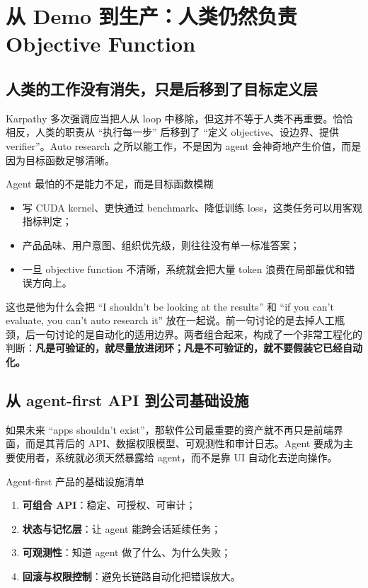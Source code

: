 \section{从 Demo 到生产：人类仍然负责 Objective Function}

\subsection{人类的工作没有消失，只是后移到了目标定义层}
Karpathy 多次强调应当把人从 loop 中移除，但这并不等于人类不再重要。恰恰相反，人类的职责从 ``执行每一步'' 后移到了 ``定义 objective、设边界、提供 verifier''。Auto research 之所以能工作，不是因为 agent 会神奇地产生价值，而是因为目标函数足够清晰。

\begin{importantbox}{Agent 最怕的不是能力不足，而是目标函数模糊}
\begin{itemize}
    \item 写 CUDA kernel、更快通过 benchmark、降低训练 loss，这类任务可以用客观指标判定；
    \item 产品品味、用户意图、组织优先级，则往往没有单一标准答案；
    \item 一旦 objective function 不清晰，系统就会把大量 token 浪费在局部最优和错误方向上。
\end{itemize}
\end{importantbox}

这也是他为什么会把 ``I shouldn't be looking at the results'' 和 ``if you can't evaluate, you can't auto research it'' 放在一起说。前一句讨论的是去掉人工瓶颈，后一句讨论的是自动化的适用边界。两者组合起来，构成了一个非常工程化的判断：\textbf{凡是可验证的，就尽量放进闭环；凡是不可验证的，就不要假装它已经自动化。}

\subsection{从 agent-first API 到公司基础设施}
如果未来 ``apps shouldn't exist''，那软件公司最重要的资产就不再只是前端界面，而是其背后的 API、数据权限模型、可观测性和审计日志。Agent 要成为主要使用者，系统就必须天然暴露给 agent，而不是靠 UI 自动化去逆向操作。

\begin{knowledgebox}{Agent-first 产品的基础设施清单}
\begin{enumerate}
    \item \textbf{可组合 API}：稳定、可授权、可审计；
    \item \textbf{状态与记忆层}：让 agent 能跨会话延续任务；
    \item \textbf{可观测性}：知道 agent 做了什么、为什么失败；
    \item \textbf{回滚与权限控制}：避免长链路自动化把错误放大。
\end{enumerate}
\end{knowledgebox}

